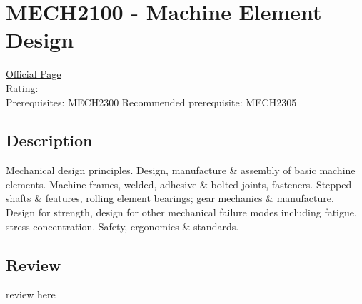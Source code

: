 \hypertarget{MECH2100}{\section{MECH2100 - Machine Element Design}}

\large
\textcolor{turbo_purple}{\href{https://my.uq.edu.au/programs-courses/course.html?course_code=MECH2100}{Official Page}} \\
Rating: \cstar\cstar\cstar\cstar\ostar \\
Prerequisites: MECH2300 
Recommended prerequisite: MECH2305

\normalsize
\subsection*{Description}
Mechanical design principles.
Design, manufacture \& assembly of basic machine elements.
Machine frames, welded, adhesive \& bolted joints, fasteners.
Stepped shafts \& features, rolling element bearings; gear mechanics \& manufacture.
Design for strength, design for other mechanical failure modes including fatigue, stress concentration.
Safety, ergonomics \& standards.

\subsection*{Review}
review here
